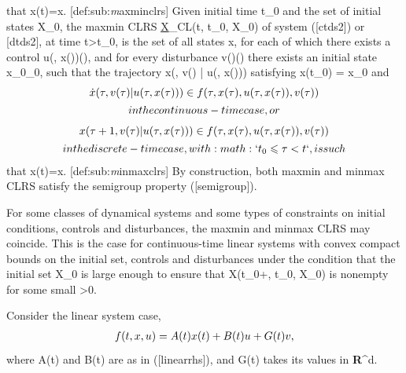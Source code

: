 \documentclass[letterpaper,10pt,english]{sphinxmanual}
\begin{document}
that x(t)=x. {[}def:sub:\emph{m}axminclrs{]} Given initial time
t_0 and the set of initial states {\mathcal X}_0, the
maxmin CLRS
\underline{{\mathcal X}}_{CL}(t, t_0, {\mathcal X}_0) of system
({[}ctds2{]}) or {[}dtds2{]}, at time t>t_0, is the set of all states
x, for each of which there exists a control
u(\tau, x(\tau))(\tau), and for every disturbance
v(\tau)(\tau) there exists an initial state
x_0_0, such that the trajectory
x(\tau, v(\tau) | u(\tau, x(\tau))) satisfying
x(t_0) = x_0 and
\begin{gather}
\begin{split}  \dot{x}(\tau, v(\tau) | u(\tau, x(\tau))) \in
  f(\tau, x(\tau), u(\tau, x(\tau)), v(\tau))\end{split}\notag\\\begin{split}in the continuous-time case, or\end{split}\notag
\end{gather}\begin{gather}
\begin{split}  x(\tau+1, v(\tau) | u(\tau, x(\tau))) \in
  f(\tau, x(\tau), u(\tau, x(\tau)), v(\tau))\end{split}\notag\\\begin{split}in the discrete-time case, with :math:`t_0\leqslant\tau<t`, is such\end{split}\notag
\end{gather}
that x(t)=x. {[}def:sub:\emph{m}inmaxclrs{]} By construction, both
maxmin and minmax CLRS satisfy the semigroup property ({[}semigroup{]}).

For some classes of dynamical systems and some types of constraints on
initial conditions, controls and disturbances, the maxmin and minmax
CLRS may coincide. This is the case for continuous-time linear systems
with convex compact bounds on the initial set, controls and disturbances
under the condition that the initial set {\mathcal X}_0 is large
enough to ensure that
{\mathcal X}(t_0+\epsilon, t_0, {\mathcal X}_0) is nonempty for
some small \epsilon>0.

Consider the linear system case,
\begin{gather}
\begin{split}f(t, x, u) = A(t)x(t) + B(t)u + G(t)v,
\label{linearrhsdist}\end{split}\notag
\end{gather}
where A(t) and B(t) are as in ({[}linearrhs{]}), and
G(t) takes its values in {\bf R}^d.
\end{document}
